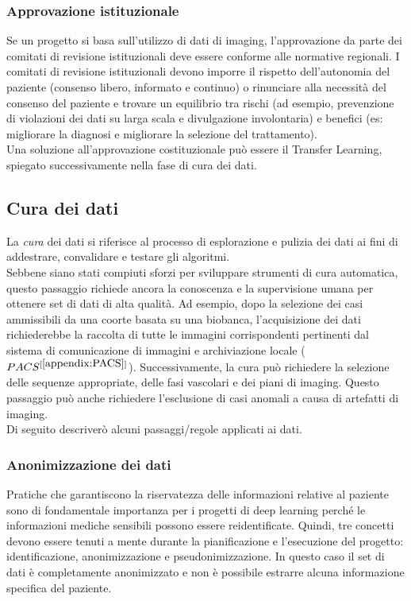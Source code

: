 \documentclass[12pt,a4paper]{report}
\begin{document}
\subsubsection{Approvazione istituzionale}
Se un progetto si basa sull’utilizzo di dati di imaging, l'approvazione da parte dei comitati di revisione istituzionali deve essere conforme alle normative regionali. I comitati di revisione istituzionali devono imporre il rispetto dell'autonomia del paziente (consenso libero, informato e continuo) o rinunciare alla necessità del consenso del paziente e trovare un equilibrio tra rischi (ad esempio, prevenzione di violazioni dei dati su larga scala e divulgazione involontaria) e benefici (es: migliorare la diagnosi e migliorare la selezione del trattamento).\\
Una soluzione all'approvazione costituzionale può essere il Transfer Learning, spiegato successivamente nella fase di cura dei dati.

\subsection{Cura dei dati}
La \emph{cura} dei dati si riferisce al processo di esplorazione e pulizia dei dati ai fini di addestrare, convalidare e testare gli algoritmi. \\
Sebbene siano stati compiuti sforzi per sviluppare strumenti di cura automatica, questo passaggio richiede ancora la conoscenza e la supervisione umana per ottenere set di dati di alta qualità.
Ad esempio, dopo la selezione dei casi ammissibili da una coorte basata su una biobanca, l'acquisizione dei dati richiederebbe la raccolta di tutte le immagini corrispondenti pertinenti dal sistema di comunicazione di immagini e archiviazione locale ($PACS^{[\ref{appendix:PACS}]}$). Successivamente, la cura può richiedere la selezione delle sequenze appropriate, delle fasi vascolari e dei piani di imaging. Questo passaggio può anche richiedere l'esclusione di casi anomali a causa di artefatti di imaging.\\
Di seguito descriverò alcuni passaggi/regole applicati ai dati.

\subsubsection{Anonimizzazione dei dati}
Pratiche che garantiscono la riservatezza delle informazioni relative al paziente sono di fondamentale importanza per i progetti di deep learning perché le informazioni mediche sensibili possono essere reidentificate. Quindi, tre concetti devono essere tenuti a mente durante la pianificazione e l'esecuzione del progetto: identificazione, anonimizzazione e pseudonimizzazione.
In questo caso il set di dati è completamente anonimizzato e non è possibile estrarre alcuna informazione specifica del paziente. 
\end{document}

